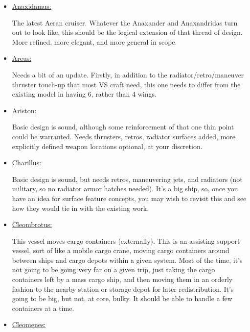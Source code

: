 \begin{itemize}
\item \href{http://vegastrike.sourceforge.net/wiki/Vessel:Anaxidamus}{Anaxidamus:}

The latest Aeran cruiser. Whatever the Anaxander and Anaxandridas turn
out to look like, this should be the logical extension of that thread
of design. More refined, more elegant, and more general in scope.


\item \href{http://vegastrike.sourceforge.net/wiki/Vessel:Areus}{Areus:}

Needs a bit of an update. Firstly, in addition to the
radiator/retro/maneuver thruster touch-up that most VS craft need, this
one needs to differ from the existing model in having 6, rather than 4
wings.



\item \href{http://vegastrike.sourceforge.net/wiki/Vessel:Ariston}{Ariston:}

Basic design is sound, although some reinforcement of that one thin
point could be warranted. Needs thrusters, retros, radiator surfaces
added, more explicitly defined weapon locations optional, at your
discretion.


\item \href{http://vegastrike.sourceforge.net/wiki/Vessel:Charillus}{Charillus:}

Basic design is sound, but needs retros, maneuvering jets, and
radiators (not military, so no radiator armor hatches needed). It's a
big ship, so, once you have an idea for surface feature concepts, you
may wish to revisit this and see how they would tie in with the
existing work.


\item \href{http://vegastrike.sourceforge.net/wiki/Vessel:Cleombrotus}{Cleombrotus:}

This vessel moves cargo containers (externally). This is an assisting
support vessel, sort of like a mobile cargo crane, moving cargo
containers around between ships and cargo depots within a given
system. Most of the time, it's not going to be going very far on a
given trip, just taking the cargo containers left by a mass cargo
ship, and then moving them in an orderly fashion to the nearby station
or storage depot for later redistribution. It's going to be big, but
not, at core, bulky. It should be able to handle a few containers at a
time.



\item \href{http://vegastrike.sourceforge.net/wiki/Vessel:Cleomenes}{Cleomenes:}


\end{itemize}
